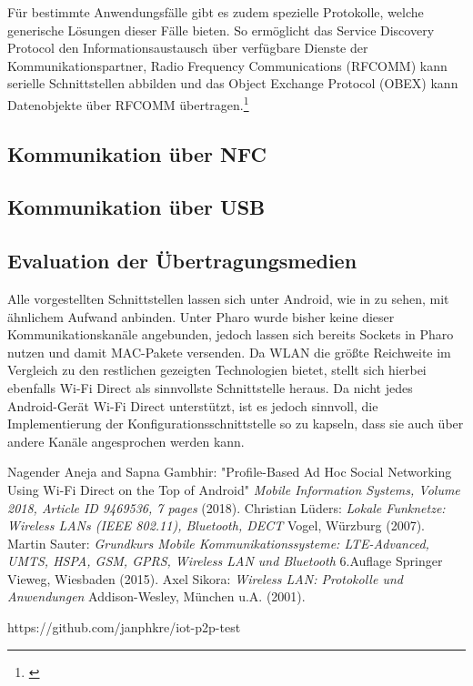 \documentclass[12pt,a4paper]{article}
\begin{document}
            Für bestimmte Anwendungsfälle gibt es zudem spezielle Protokolle,
            welche generische Lösungen dieser Fälle bieten. So ermöglicht das Service Discovery Protocol den Informationsaustausch über verfügbare Dienste der Kommunikationspartner,
            Radio Frequency Communications (RFCOMM) kann serielle Schnittstellen abbilden und das Object Exchange Protocol (OBEX) kann Datenobjekte über RFCOMM übertragen.\footnote{\cite[S.229]{Lueders}}

        \subsection{Kommunikation über NFC}

        \subsection{Kommunikation über USB}

        \subsection{Evaluation der Übertragungsmedien}
        Alle vorgestellten Schnittstellen lassen sich unter Android, wie in \cite{test-repository} zu sehen, mit ähnlichem Aufwand anbinden. Unter Pharo wurde bisher keine dieser Kommunikationskanäle angebunden,
        jedoch lassen sich bereits Sockets in Pharo nutzen und damit MAC-Pakete versenden.
        Da WLAN die größte Reichweite im Vergleich zu den restlichen gezeigten Technologien bietet, stellt sich hierbei ebenfalls Wi-Fi Direct als sinnvollste Schnittstelle heraus.
        Da nicht jedes Android-Gerät Wi-Fi Direct unterstützt, ist es jedoch sinnvoll, die Implementierung der Konfigurationsschnittstelle so zu kapseln,
        dass sie auch über andere Kanäle angesprochen werden kann.
    \pagebreak
    \begin{thebibliography}{10}
        Nagender Aneja and Sapna Gambhir: "Profile-Based Ad Hoc Social Networking Using Wi-Fi Direct on the Top of Android" {\it Mobile Information Systems, Volume 2018, Article ID 9469536, 7 pages} (2018).
        Christian Lüders: {\it Lokale Funknetze: Wireless LANs (IEEE 802.11), Bluetooth, DECT} Vogel, Würzburg (2007).
        Martin Sauter: {\it Grundkurs Mobile Kommunikationssysteme: LTE-Advanced, UMTS, HSPA, GSM, GPRS, Wireless LAN und Bluetooth} 6.Auflage Springer Vieweg, Wiesbaden (2015).
        Axel Sikora: {\it Wireless LAN: Protokolle und Anwendungen} Addison-Wesley, München u.A. (2001).

        https://github.com/janphkre/iot-p2p-test
    \end{thebibliography}
\end{document}
